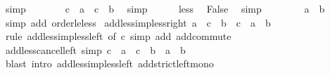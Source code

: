 \begin{isabellebody}
\ simp\isanewline
\ \ \ \ \isamarkupfalse%
\ \isamarkupfalse%
\ {\isachardoublequoteopen}c\ {\isacharplus}{\kern0pt}\ a\ {\isacharequal}{\kern0pt}\ c\ {\isacharplus}{\kern0pt}\ b{\isachardoublequoteclose}\ \isamarkupfalse%
\ simp\isanewline
\ \ \ \ \isamarkupfalse%
\ less\ \isamarkupfalse%
\ {\isachardoublequoteopen}False{\isachardoublequoteclose}\ \isamarkupfalse%
\ simp\isanewline
\ \ \isamarkupfalse%
\isanewline
\ \ \isamarkupfalse%
\ \isamarkupfalse%
\ {\isachardoublequoteopen}a\ {\isacharless}{\kern0pt}\ b{\isachardoublequoteclose}\isanewline
\ \ \ \ \isamarkupfalse%
\ {\isacharparenleft}{\kern0pt}simp\ add{\isacharcolon}{\kern0pt}\ order{\isacharunderscore}{\kern0pt}le{\isacharunderscore}{\kern0pt}less{\isacharparenright}{\kern0pt}\isanewline
{}\isamarkupfalse%
%
\endisatagproof
{\isafoldproof}%
%
\isadelimproof
\isanewline
%
\endisadelimproof
\isanewline
{}\isamarkupfalse%
\ add{\isacharunderscore}{\kern0pt}less{\isacharunderscore}{\kern0pt}imp{\isacharunderscore}{\kern0pt}less{\isacharunderscore}{\kern0pt}right{\isacharcolon}{\kern0pt}\ {\isachardoublequoteopen}a\ {\isacharplus}{\kern0pt}\ c\ {\isacharless}{\kern0pt}\ b\ {\isacharplus}{\kern0pt}\ c\ {\isasymLongrightarrow}\ a\ {\isacharless}{\kern0pt}\ b{\isachardoublequoteclose}\isanewline
%
\isadelimproof
\ \ %
\endisadelimproof
%
\isatagproof
{}\isamarkupfalse%
\ {\isacharparenleft}{\kern0pt}rule\ add{\isacharunderscore}{\kern0pt}less{\isacharunderscore}{\kern0pt}imp{\isacharunderscore}{\kern0pt}less{\isacharunderscore}{\kern0pt}left\ {\isacharbrackleft}{\kern0pt}of\ c{\isacharbrackright}{\kern0pt}{\isacharparenright}{\kern0pt}\ {\isacharparenleft}{\kern0pt}simp\ add{\isacharcolon}{\kern0pt}\ add{\isachardot}{\kern0pt}commute{\isacharparenright}{\kern0pt}%
\endisatagproof
{\isafoldproof}%
%
\isadelimproof
\isanewline
%
\endisadelimproof
\isanewline
{}\isamarkupfalse%
\ add{\isacharunderscore}{\kern0pt}less{\isacharunderscore}{\kern0pt}cancel{\isacharunderscore}{\kern0pt}left\ {\isacharbrackleft}{\kern0pt}simp{\isacharbrackright}{\kern0pt}{\isacharcolon}{\kern0pt}\ {\isachardoublequoteopen}c\ {\isacharplus}{\kern0pt}\ a\ {\isacharless}{\kern0pt}\ c\ {\isacharplus}{\kern0pt}\ b\ {\isasymlongleftrightarrow}\ a\ {\isacharless}{\kern0pt}\ b{\isachardoublequoteclose}\isanewline
%
\isadelimproof
\ \ %
\endisadelimproof
%
\isatagproof
{}\isamarkupfalse%
\ {\isacharparenleft}{\kern0pt}blast\ intro{\isacharcolon}{\kern0pt}\ add{\isacharunderscore}{\kern0pt}less{\isacharunderscore}{\kern0pt}imp{\isacharunderscore}{\kern0pt}less{\isacharunderscore}{\kern0pt}left\ add{\isacharunderscore}{\kern0pt}strict{\isacharunderscore}{\kern0pt}left{\isacharunderscore}{\kern0pt}mono{\isacharparenright}{\kern0pt}%

\end{isabellebody}
